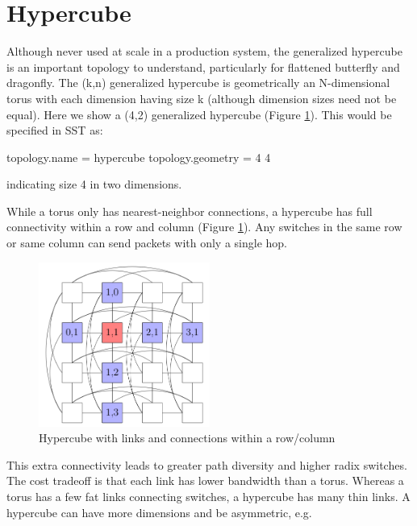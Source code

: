 \section{Hypercube}
\label{subsec:tutorial:hypercube}

Although never used at scale in a production system, the generalized hypercube is an important topology to understand, particularly for flattened butterfly and dragonfly.
The (k,n) generalized hypercube is geometrically an N-dimensional torus with each dimension having size k (although dimension sizes need not be equal).
Here we show a (4,2) generalized hypercube (Figure \ref{fig:topologies:hypercubeConnected}).  This would be specified in SST as:

\begin{ViFile}
topology.name = hypercube
topology.geometry = 4 4 
\end{ViFile}
indicating size 4 in two dimensions. 

While a torus only has nearest-neighbor connections, a hypercube has full connectivity within a row and column (Figure \ref{fig:topologies:hypercubeConnected}).
Any switches in the same row or same column can send packets with only a single hop.

\begin{figure}[h!]
\centering
\includegraphics[width=0.5\textwidth]{figures/tikz/hypercube/hypercube_connected.png}
\caption{Hypercube with links and connections within a row/column}
\label{fig:topologies:hypercubeConnected}
\end{figure}

This extra connectivity leads to greater path diversity and higher radix switches.
The cost tradeoff is that each link has lower bandwidth than a torus. 
Whereas a torus has a few fat links connecting switches, a hypercube has many thin links.
A hypercube can have more dimensions and be asymmetric, e.g.

